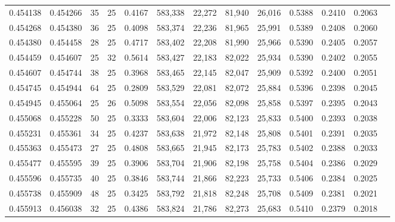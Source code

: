 \begin{tabular}{rrrrrrrrrrrrr}
0.454138 & 0.454266 &    35 &  25 &                                     0.4167 & 583,338 &  22,272 &  81,940 &  26,016 & 0.5388 & 0.2410 & 0.2063 \\
0.454268 & 0.454380 &    36 &  25 &                                     0.4098 & 583,374 &  22,236 &  81,965 &  25,991 & 0.5389 & 0.2408 & 0.2060 \\
0.454380 & 0.454458 &    28 &  25 &                                     0.4717 & 583,402 &  22,208 &  81,990 &  25,966 & 0.5390 & 0.2405 & 0.2057 \\
0.454459 & 0.454607 &    25 &  32 &                                     0.5614 & 583,427 &  22,183 &  82,022 &  25,934 & 0.5390 & 0.2402 & 0.2055 \\
0.454607 & 0.454744 &    38 &  25 &                                     0.3968 & 583,465 &  22,145 &  82,047 &  25,909 & 0.5392 & 0.2400 & 0.2051 \\
0.454745 & 0.454944 &    64 &  25 &                                     0.2809 & 583,529 &  22,081 &  82,072 &  25,884 & 0.5396 & 0.2398 & 0.2045 \\
0.454945 & 0.455064 &    25 &  26 &                                     0.5098 & 583,554 &  22,056 &  82,098 &  25,858 & 0.5397 & 0.2395 & 0.2043 \\
0.455068 & 0.455228 &    50 &  25 &                                     0.3333 & 583,604 &  22,006 &  82,123 &  25,833 & 0.5400 & 0.2393 & 0.2038 \\
0.455231 & 0.455361 &    34 &  25 &                                     0.4237 & 583,638 &  21,972 &  82,148 &  25,808 & 0.5401 & 0.2391 & 0.2035 \\
0.455363 & 0.455473 &    27 &  25 &                                     0.4808 & 583,665 &  21,945 &  82,173 &  25,783 & 0.5402 & 0.2388 & 0.2033 \\
0.455477 & 0.455595 &    39 &  25 &                                     0.3906 & 583,704 &  21,906 &  82,198 &  25,758 & 0.5404 & 0.2386 & 0.2029 \\
0.455596 & 0.455735 &    40 &  25 &                                     0.3846 & 583,744 &  21,866 &  82,223 &  25,733 & 0.5406 & 0.2384 & 0.2025 \\
0.455738 & 0.455909 &    48 &  25 &                                     0.3425 & 583,792 &  21,818 &  82,248 &  25,708 & 0.5409 & 0.2381 & 0.2021 \\
0.455913 & 0.456038 &    32 &  25 &                                     0.4386 & 583,824 &  21,786 &  82,273 &  25,683 & 0.5410 & 0.2379 & 0.2018 \\

\end{tabular}
